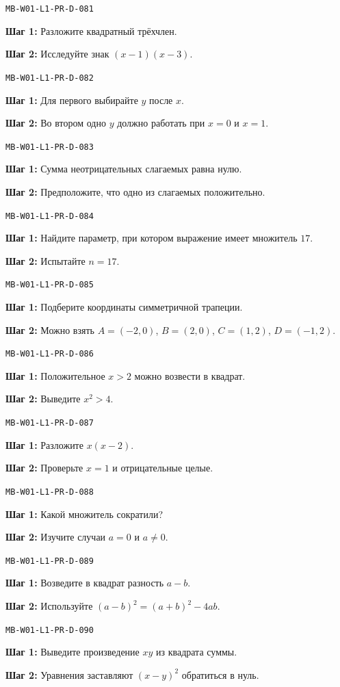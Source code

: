\documentclass[11pt,a4paper,openany]{book}
\newcommand{\muid}[1]{\texttt{\footnotesize #1}}
\begin{document}
\noindent\muid{MB-W01-L1-PR-D-081}\par 
\textbf{Шаг 1:} Разложите квадратный трёхчлен.\par \textbf{Шаг 2:} Исследуйте знак $(x-1)(x-3)$.\smallskip

\noindent\muid{MB-W01-L1-PR-D-082}\par 
\textbf{Шаг 1:} Для первого выбирайте $y$ после $x$.\par \textbf{Шаг 2:} Во втором одно $y$ должно работать при $x=0$ и $x=1$.\smallskip

\noindent\muid{MB-W01-L1-PR-D-083}\par 
\textbf{Шаг 1:} Сумма неотрицательных слагаемых равна нулю.\par \textbf{Шаг 2:} Предположите, что одно из слагаемых положительно.\smallskip

\noindent\muid{MB-W01-L1-PR-D-084}\par 
\textbf{Шаг 1:} Найдите параметр, при котором выражение имеет множитель $17$.\par \textbf{Шаг 2:} Испытайте $n=17$.\smallskip

\noindent\muid{MB-W01-L1-PR-D-085}\par 
\textbf{Шаг 1:} Подберите координаты симметричной трапеции.\par \textbf{Шаг 2:} Можно взять $A=(-2,0)$, $B=(2,0)$, $C=(1,2)$, $D=(-1,2)$.\smallskip

\noindent\muid{MB-W01-L1-PR-D-086}\par 
\textbf{Шаг 1:} Положительное $x>2$ можно возвести в квадрат.\par \textbf{Шаг 2:} Выведите $x^2>4$.\smallskip

\noindent\muid{MB-W01-L1-PR-D-087}\par 
\textbf{Шаг 1:} Разложите $x(x-2)$.\par \textbf{Шаг 2:} Проверьте $x=1$ и отрицательные целые.\smallskip

\noindent\muid{MB-W01-L1-PR-D-088}\par 
\textbf{Шаг 1:} Какой множитель сократили?\par \textbf{Шаг 2:} Изучите случаи $a=0$ и $a\ne0$.\smallskip

\noindent\muid{MB-W01-L1-PR-D-089}\par 
\textbf{Шаг 1:} Возведите в квадрат разность $a-b$.\par \textbf{Шаг 2:} Используйте $(a-b)^2=(a+b)^2-4ab$.\smallskip

\noindent\muid{MB-W01-L1-PR-D-090}\par 
\textbf{Шаг 1:} Выведите произведение $xy$ из квадрата суммы.\par \textbf{Шаг 2:} Уравнения заставляют $(x-y)^2$ обратиться в нуль.\smallskip
\end{document}
